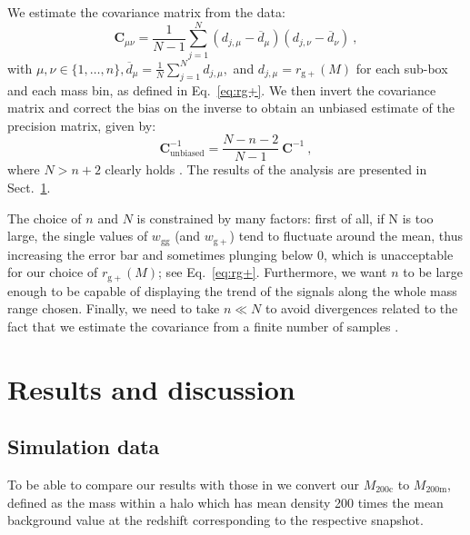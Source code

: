 \documentclass[a4paper,fleqn,usenatbib]{mnras}
\begin{document}
We estimate the covariance matrix from the data:
\begin{equation}
     \mathbf{C}_{\mu \nu} = \frac{1}{N-1} \sum_{j = 1}^{N} (d_{j, \mu} - \overline{d}_{\mu})(d_{j, \nu} - \overline{d}_{\nu}) \ ,
	\label{eq:covariance}
\end{equation}
with $\mu, \nu \in \{1, \dotso, n\}, \overline{d}_{\mu} = \frac{1}{N} \sum_{j=1}^{N} d_{j, \mu},$ and $d_{j, \mu}= r_{\mathrm{g+}}(M)$ for each sub-box and each mass bin, as defined in Eq.~\ref{eq:rg+}. We then invert the covariance matrix and correct the bias on the inverse to obtain an unbiased estimate of the precision matrix, given by:
\begin{equation}
     \mathbf{C}^{-1}_{\mathrm{unbiased}} = \frac{N - n -2}{N-1} \  \mathbf{C}^{-1} \ ,
	\label{eq:precunbiased}
\end{equation}
where $N > n+2$ clearly holds \citep{Tayloretal2013}. The results of the analysis are presented in Sect.~\ref{sec:resanddiscuss}.

The choice of $n$ and $N$ is constrained by many factors: first of all, if N is too large, the single values of $w_{\mathrm{gg}}$ (and $w_{\mathrm{g+}}$) tend to fluctuate around the mean, thus increasing the error bar and sometimes plunging below 0, which is unacceptable for our choice of $ r_{\mathrm{g+}} (M)$; see Eq.~\ref{eq:rg+}. Furthermore, we want $n$ to be large enough to be capable of displaying the trend of the signals along the whole mass range chosen. Finally, we need to take $n \ll N$ to avoid divergences related to the fact that we estimate the covariance from a finite number of samples \citep{Tayloretal2013}.

\section{Results and discussion}
\label{sec:resanddiscuss}
\subsection{Simulation data}
\label{subsec:simdatard}
To be able to compare our results with those in \citet[figure 7]{vanUitertJoachimi2017} we convert our $M_{\mathrm{200c}}$ to $M_{\mathrm{200m}}$, defined as the mass within a halo which has mean density 200 times the mean background value at the redshift corresponding to the respective snapshot.
\end{document}
